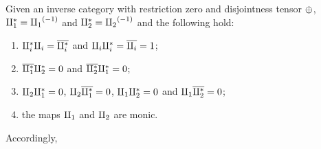 \begin{lemma}\label{lem:tensor_identities}
  Given an inverse category \X with restriction zero and disjointness tensor $\oplus$,
  $\amalg_{1}^{*} = {\amalg_{1}}^{(-1)}$ and $\amalg_{2}^{*} = {\amalg_{2}}^{(-1)}$ and the following hold:
  \begin{enumerate}
    \item $\amalg_{i}^{*} \amalg_{i} = \overline{\amalg_{i}^{*}}$ and $\amalg_{i}\amalg_{i}^{*} = \overline{\amalg_{i}} = 1$;
    \item $\overline{\amalg_{1}^{*}} \amalg_{2}^{*} = 0$ and $\overline{\amalg_{2}^{*}} \amalg_{1}^{*} = 0$;
    \item $\amalg_{2} \amalg_{1}^{*} = 0$, $\amalg_{2} \overline{\amalg_{1}^{*}} = 0$,  $\amalg_{1} \amalg_{2}^{*} = 0$ and
      $\amalg_{1} \overline{\amalg_{2}^{*}} = 0$;
    \item the maps $\amalg_{1}$ and $\amalg_{2}$ are monic.
  \end{enumerate}
  Accordingly,
\end{lemma}
